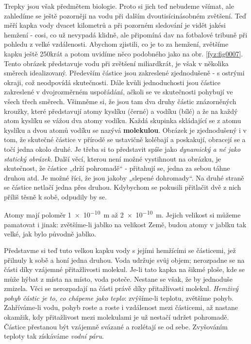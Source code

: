     Trepky jsou však předmětem biologie. Proto si jich teď nebudeme všímat, ale zahledíme se ještě
    pozorněji na vodu při dalším dvoutisícinásobném zvětšení. Teď měří kapka vody dvacet kilometrů a
    při pozorném sledování je vidět jakési hemžení - cosi, co už nevypadá klidně, ale připomíná dav
    na fotbalové tribuně při pohledu z velké vzdálenosti. Abychom zjistili, co je to za hemžení,
    zvětšíme kapku ještě 250krát a potom uvidíme něco podobného jako na obr. \ref{fyz:fig0007}. Tento
    obrázek představuje vodu při zvětšení miliardkrát, je však v několika směrech idealizovaný.
    Především částice jsou zakreslené zjednodušeně - s ostrými okraji, což neodpovídá skutečnosti.
    Dále kvůli jednoduchosti jsou částice zakreslené v dvojrozměrném uspořádání, ačkoli se ve
    skutečnosti pohybují ve všech třech směrech. Všimněme si, že jsou tam dva druhy částic
    znázorněných kroužky, které představují atomy kyslíku (černé) a vodíku (bílé) a že na každý atom
    kyslíku se vážou dva atomy vodíku. Každá skupinka skládající se z atomu kyslíku a dvou atomů
    vodíku se nazývá \textbf{molekulou}. Obrázek je zjednodušený i v tom, že skutečné částice v
    přírodě se ustavičně kolébají a poskakují, obracejí se a točí jedna okolo druhé. Je třeba si to
    představit spíše jako \emph{dynamický a né jako statický obrázek}. Další věcí, kterou není možné
    vystihnout na obrázku, je skutečnost, že částice „drží pohromadě“ - přitahují se, jedna za sebou
    táhne druhou atd. Je možné říci, že jsou jakoby „slepené dohromady“. Na druhé straně se částice
    netlačí jedna přes druhou. Kdybychom se pokusili přitlačit dvě z nich příliš těsně k sobě,
    odpudily by se.

    Atomy mají poloměr \SI{1e-10}{\m} až \SI{2e-10}{\m}. Jejich velikost si můžeme pamatovat i
    jinak: zvětšíme-li jablko na velikost Země, budou atomy v jablku tak velké, jak bylo původně
    jablko.

    Představme si teď tuto velkou kapku vody s jejími hemžícími se částicemi, jež přilnuly k sobě a
    honí jedna druhou. Voda udržuje svůj objem; nerozpadne se na části díky vzájemné přitažlivosti
    molekul. Je-li tato kapka na šikmé ploše, kde se může hýbat z místa na místo, voda poteče.
    Nestane se však, že by jednoduše zmizela. Věci se nerozpadají na části právě díky přitažlivosti
    molekul. \emph{Hemživý pohyb částic je to, co chápeme jako teplo}: zvýšíme-li teplotu, zvětšíme
    pohyb. Zahříváme-li vodu, pohyb roste a roste i vzdálenost mezi částicemi, až nastane okamžik,
    kdy přitažlivost mezi molekulami je už nestačí udržet pohromadě. Částice přestanou být vzájemně
    svázané a rozlétají se od sebe. Zvyšováním teploty tak získáváme \emph{vodní páru}.  
    
